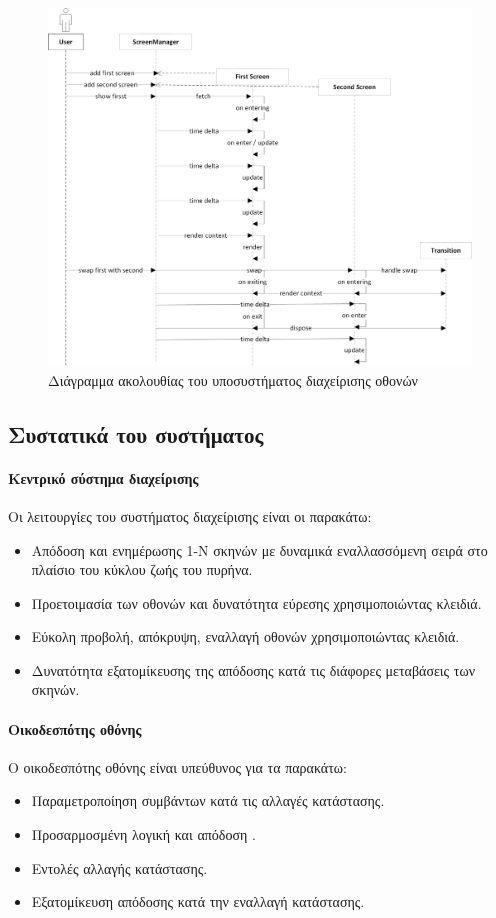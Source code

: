 	\begin{figure}[h!]
		\centering
		\includegraphics[width=165mm]{Images/screensystem_sequence}
		\caption{Διάγραμμα ακολουθίας του υποσυστήματος διαχείρισης οθονών}
		\label{fig:screensystem_sequence}
	\end{figure}	
	
	\subsection{Συστατικά του συστήματος}		
	\paragraph{Κεντρικό σύστημα διαχείρισης}
	Οι λειτουργίες του συστήματος διαχείρισης είναι οι παρακάτω:
	\begin{itemize}
	\item Απόδοση και ενημέρωσης 1-N σκηνών με δυναμικά εναλλασσόμενη σειρά στο πλαίσιο του κύκλου ζωής του πυρήνα.
	\item Προετοιμασία των οθονών και δυνατότητα εύρεσης χρησιμοποιώντας κλειδιά.
	\item Εύκολη προβολή, απόκρυψη, εναλλαγή οθονών χρησιμοποιώντας κλειδιά.
	\item Δυνατότητα εξατομίκευσης της απόδοσης κατά τις διάφορες μεταβάσεις των σκηνών.
	\end{itemize}

	\paragraph{Οικοδεσπότης οθόνης}
	Ο οικοδεσπότης οθόνης είναι υπεύθυνος για τα παρακάτω:
	\begin{itemize}
		\item Παραμετροποίηση συμβάντων κατά τις αλλαγές κατάστασης.
		\item Προσαρμοσμένη λογική και απόδοση .
		\item Εντολές αλλαγής κατάστασης.
		\item Εξατομίκευση απόδοσης κατά την εναλλαγή κατάστασης.
	\end{itemize}
	
